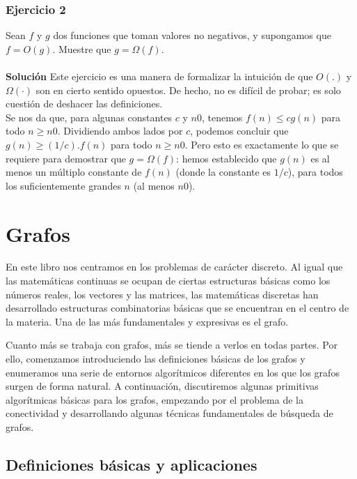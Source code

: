 \documentclass[a4paper, 12pt]{book}
\theoremstyle{dotless}
\begin{document}
\subsection*{Ejercicio 2} 

Sean $f$ y $g$ dos funciones que toman valores no negativos, y supongamos que $f=O(g)$. Muestre que $g=\Omega(f)$.\\\\
\textbf{Solución} Este ejercicio es una manera de formalizar la intuición de que $O(.)$ y $\Omega(·)$ son en cierto sentido opuestos. De hecho, no es difícil de probar; es solo cuestión de deshacer las definiciones.\\
Se nos da que, para algunas constantes $c$ y $n0$, tenemos $f(n)≤cg(n)$ para todo $n≥n0$. Dividiendo ambos lados por $c$, podemos concluir que $g(n)≥(1/c).f(n)$ para todo $n≥n0$. Pero esto es exactamente lo que se requiere para demostrar que $g=\Omega(f)$: hemos establecido que $g(n)$ es al menos un múltiplo constante de $f(n)$ (donde la constante es $1/c$), para todos los suficientemente grandes $n$ (al menos $n0$).\\


\chapter{Grafos}
\label{ch:grafos}


En este libro nos centramos en los problemas de carácter discreto. Al igual que las matemáticas continuas se ocupan de ciertas estructuras básicas como los números reales, los vectores y las matrices, las matemáticas discretas han desarrollado estructuras combinatorias básicas que se encuentran en el centro de la materia. Una de las más fundamentales y expresivas es el grafo.

Cuanto más se trabaja con grafos, más se tiende a verlos en todas partes. Por ello, comenzamos introduciendo las definiciones básicas de los grafos y enumeramos una serie de entornos algorítmicos diferentes en los que los grafos surgen de forma natural. A continuación, discutiremos algunas primitivas algorítmicas básicas para los grafos, empezando por el problema de la conectividad y desarrollando algunas técnicas fundamentales de búsqueda de grafos.

\section{Definiciones básicas y aplicaciones}
\end{document}
